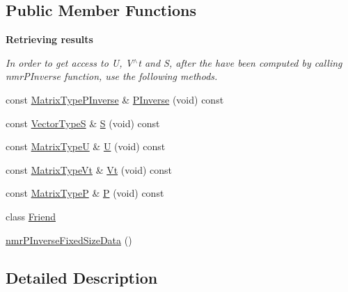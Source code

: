 \subsection*{Public Member Functions}
\begin{Indent}{\bf Retrieving results}\par
{\em In order to get access to U, V$^\wedge$t and S, after the have been computed by calling nmr\-P\-Inverse function, use the following methods. }\begin{DoxyCompactItemize}
\item 
const \hyperlink{classnmr_p_inverse_fixed_size_data_a6c4787ecd9e2e7155fd857fb4427c7b0}{Matrix\-Type\-P\-Inverse} \& \hyperlink{classnmr_p_inverse_fixed_size_data_a2f7b17c39f8ee3c5507a9972cd71cdd4}{P\-Inverse} (void) const 
\item 
const \hyperlink{classnmr_p_inverse_fixed_size_data_a55ba424dddf7bd0797b80bc468a209b0}{Vector\-Type\-S} \& \hyperlink{classnmr_p_inverse_fixed_size_data_a2c50698928453067de9a6aba235c4897}{S} (void) const 
\item 
const \hyperlink{classnmr_p_inverse_fixed_size_data_aef6864d119646cca01fc7a27d9eec4fa}{Matrix\-Type\-U} \& \hyperlink{classnmr_p_inverse_fixed_size_data_a71645b7e6188fe5a505f675462641f24}{U} (void) const 
\item 
const \hyperlink{classnmr_p_inverse_fixed_size_data_a61bc7c8325cf61f5c530759364ce185a}{Matrix\-Type\-Vt} \& \hyperlink{classnmr_p_inverse_fixed_size_data_a30eb8478f5f2baab309d3e288c8f99f3}{Vt} (void) const 
\item 
const \hyperlink{classnmr_p_inverse_fixed_size_data_abbeb86284eb856bc18f108e80906b04d}{Matrix\-Type\-P} \& \hyperlink{classnmr_p_inverse_fixed_size_data_a34cb376766bae89c6530a699dca4e04a}{P} (void) const 
\end{DoxyCompactItemize}
\end{Indent}
\begin{DoxyCompactItemize}
\item 
class \hyperlink{classnmr_p_inverse_fixed_size_data_a7f8321d57e81bc613d5dbef3410ba70e}{Friend}
\item 
\hyperlink{classnmr_p_inverse_fixed_size_data_a48c00a3fc941733de8cfb894b36802b2}{nmr\-P\-Inverse\-Fixed\-Size\-Data} ()
\end{DoxyCompactItemize}


\subsection{Detailed Description}
